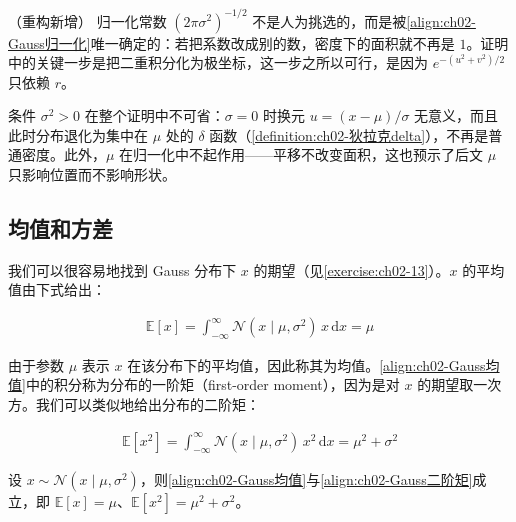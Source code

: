 \documentclass[../../main.tex]{subfiles}
\begin{document}
\begin{remark}（重构新增）
归一化常数 $(2\pi\sigma^{2})^{-1/2}$ 不是人为挑选的，而是被\eqref{align:ch02-Gauss归一化}唯一确定的：若把系数改成别的数，密度下的面积就不再是 $1$。证明中的关键一步是把二重积分化为极坐标，这一步之所以可行，是因为 $e^{-(u^{2}+v^{2})/2}$ 只依赖 $r$。

条件 $\sigma^{2}>0$ 在整个证明中不可省：$\sigma=0$ 时换元 $u=(x-\mu)/\sigma$ 无意义，而且此时分布退化为集中在 $\mu$ 处的 $\delta$ 函数（\cref{definition:ch02-狄拉克delta}），不再是普通密度。此外，$\mu$ 在归一化中不起作用——平移不改变面积，这也预示了后文 $\mu$ 只影响位置而不影响形状。
\end{remark}

\subsection{均值和方差}\label{subsection:ch02-均值和方差}

我们可以很容易地找到 Gauss 分布下 $x$ 的期望（见\cref{exercise:ch02-13}）。$x$ 的平均值由下式给出：

\begin{align}
  \mathbb{E}[x] = \int_{-\infty}^{\infty}\mathcal{N}(x\mid\mu,\sigma^{2})\,x\,\mathrm{d}x = \mu
  \label{align:ch02-Gauss均值}
\end{align}

由于参数 $\mu$ 表示 $x$ 在该分布下的平均值，因此称其为均值。\eqref{align:ch02-Gauss均值}中的积分称为分布的一阶矩（first-order moment），因为是对 $x$ 的期望取一次方。我们可以类似地给出分布的二阶矩：

\begin{align}
  \mathbb{E}\left[x^{2}\right] = \int_{-\infty}^{\infty}\mathcal{N}(x\mid\mu,\sigma^{2})\,x^{2}\,\mathrm{d}x = \mu^{2}+\sigma^{2}
  \label{align:ch02-Gauss二阶矩}
\end{align}

\begin{proposition}\label{proposition:ch02-Gauss矩}
设 $x\sim\mathcal{N}(x\mid\mu,\sigma^{2})$，则\eqref{align:ch02-Gauss均值}与\eqref{align:ch02-Gauss二阶矩}成立，即 $\mathbb{E}[x]=\mu$、$\mathbb{E}[x^{2}]=\mu^{2}+\sigma^{2}$。
\end{proposition}
\end{document}
